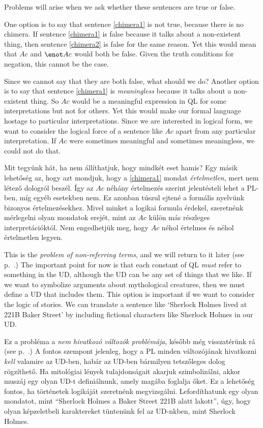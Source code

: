 Problems will arise when we ask whether these sentences are true or false.

One option is to say that sentence \ref{chimera1} is not true, because there is no chimera. If sentence \ref{chimera1} is false because it talks about a non-existent thing, then sentence \ref{chimera2} is false for the same reason. Yet this would mean that $Ac$ and $\enot Ac$ would both be false. Given the truth conditions for negation, this cannot be the case.



Since we cannot say that they are both false, what should we do? Another option is to say that sentence \ref{chimera1} is \emph{meaningless} because it talks about a non-existent thing. So $Ac$ would be a meaningful expression in QL for some interpretations but not for others. Yet this would make our formal language hostage to particular interpretations. Since we are interested in logical form, we want to consider the logical force of a sentence like $Ac$ apart from any particular interpretation. If $Ac$ were sometimes meaningful and sometimes meaningless, we could not do that.

Mit tegyünk hát, ha nem állíthatjuk, hogy mindkét eset hamis? Egy másik lehetőség az, hogy azt mondjuk, hogy a \ref{chimera1} mondat \emph{értelmetlen}, mert nem létező dologról beszél. Így az $Ac$ néhány értelmezés szerint jelentésteli lehet a PL-ben, míg egyéb esetekben nem. Ez azonban túszul ejtené a formális nyelvünk bizonyos értelmezésekhez. Mivel minket a logikai formula érdekel, szeretnénk mérlegelni olyan mondatok erejét, mint az $Ac$ külön más részleges interpretációktól. Nem engedhetjük meg, hogy $Ac$ néhol értelmes és néhol értelmetlen legyen. 

This is the \emph{problem of non-referring terms}, and we will return to it later (see p.~\pageref{subsec.defdesc}.) The important point for now is that each constant of QL \emph{must} refer to something in the UD, although the UD can be any set of things that we like. If we want to symbolize arguments about mythological creatures, then we must define a UD that includes them. This option is important if we want to consider the logic of stories. We can translate a sentence like `Sherlock Holmes lived at 221B Baker Street' by including fictional characters like Sherlock Holmes in our UD.

Ez a probléma a \emph{nem hivatkozó változók problémája}, később még visszatérünk rá (see p.~\pageref{subsec.defdesc}.) A fontos szempont jelenleg, hogy a PL minden változójának hivatkozni \emph{kell} valamire az UD-ben, habár az UD-ben bármilyen tetszőleges dolog rögzíthető. Ha mitológiai lények tulajdonságait akarjuk szimbolizálni, akkor muszáj egy olyan UD-t definiálnunk, amely magába foglalja őket. Ez a lehetőség fontos, ha történetek logikáját szeretnénk megvizsgálni. Lefordíthatunk egy olyan mondatot, mint “Sherlock Holmes a Baker Street 221B alatt lakott”, úgy, hogy olyan képzeletbeli karaktereket tüntenünk fel az UD-nkben, mint Sherlock Holmes.


